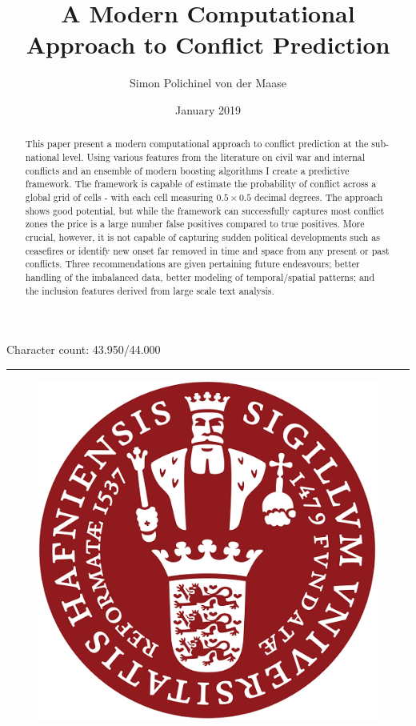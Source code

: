 \documentclass[a4paper]{article}
\title{A Modern Computational Approach to Conflict Prediction}
\author{Simon Polichinel von der Maase}
\date{January 2019}
\begin{document}
	\begin{titlepage}
		\maketitle
		Character count: 43.950/44.000\\
		\noindent\rule{\linewidth}{0.4pt}
		\begin{figure}[h]
			\centering
			\includegraphics[scale=0.32]{KU_logo.png}
		\end{figure}
		\thispagestyle{empty} %
	\end{titlepage}
    \tableofcontents
\pagebreak

\begin{abstract}

This paper present a modern computational approach to conflict prediction at the sub-national level. Using various features from the literature on civil war and internal conflicts and an ensemble of modern boosting algorithms I create a predictive framework. The framework is capable of estimate the probability of conflict across a global grid of cells - with each cell measuring $0.5 \times 0.5$ decimal degrees. The approach shows good potential, but while the framework can successfully captures most conflict zones the price is a large number false positives compared to true positives. More crucial, however, it is not capable of capturing sudden political developments such as ceasefires or identify new onset far removed in time and space from any present or past conflicts. Three recommendations are given pertaining future endeavours; better handling of the imbalanced data, better modeling of temporal/spatial patterns; and the inclusion features derived from large scale text analysis.

\end{abstract}
\pagebreak
\end{document}
